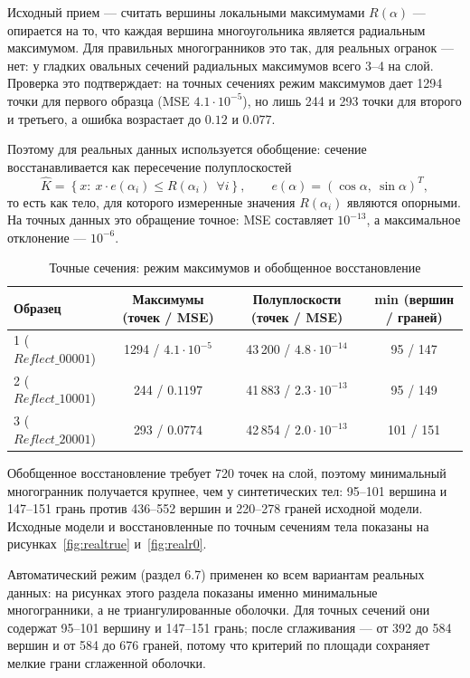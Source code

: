 \documentclass[12pt, a4paper]{article}
\begin{document}
Исходный прием --- считать вершины локальными максимумами $R(\alpha)$ --- опирается на то, что каждая вершина многоугольника является радиальным максимумом. Для правильных многогранников это так, для реальных огранок --- нет: у гладких овальных сечений радиальных максимумов всего 3--4 на слой. Проверка это подтверждает: на точных сечениях режим максимумов дает 1294 точки для первого образца (MSE $4.1\cdot10^{-5}$), но лишь 244 и 293 точки для второго и третьего, а ошибка возрастает до $0.12$ и $0.077$.

Поэтому для реальных данных используется обобщение: сечение восстанавливается как пересечение полуплоскостей
\[
\widehat K=\left\{x:\ x\cdot e(\alpha_i)\le R(\alpha_i)\ \ \forall i\right\},
\qquad e(\alpha)=(\cos\alpha,\ \sin\alpha)^T,
\]
то есть как тело, для которого измеренные значения $R(\alpha_i)$ являются опорными. На точных данных это обращение точное: MSE составляет $10^{-13}$, а максимальное отклонение --- $10^{-6}$.

\begin{table}[H]
\centering
\caption{Точные сечения: режим максимумов и обобщенное восстановление}
\label{tab:realmodes}
\footnotesize
\begin{tabular}{|l|c|c|c|}
\hline
Образец & Максимумы (точек / MSE) & Полуплоскости (точек / MSE) & min (вершин / граней) \\
\hline
1 ($Reflect\_00001$) & 1294 / $4.1\cdot10^{-5}$ & 43\,200 / $4.8\cdot10^{-14}$ & 95 / 147 \\
2 ($Reflect\_10001$) & 244 / $0.1197$ & 41\,883 / $2.3\cdot10^{-13}$ & 95 / 149 \\
3 ($Reflect\_20001$) & 293 / $0.0774$ & 42\,854 / $2.0\cdot10^{-13}$ & 101 / 151 \\
\hline
\end{tabular}
\end{table}

Обобщенное восстановление требует 720 точек на слой, поэтому минимальный многогранник получается крупнее, чем у синтетических тел: 95--101 вершина и 147--151 грань против 436--552 вершин и 220--278 граней исходной модели. Исходные модели и восстановленные по точным сечениям тела показаны на рисунках~\ref{fig:realtrue} и~\ref{fig:realr0}.

Автоматический режим (раздел 6.7) применен ко всем вариантам реальных данных: на рисунках этого раздела показаны именно минимальные многогранники, а не триангулированные оболочки. Для точных сечений они содержат 95--101 вершину и 147--151 грань; после сглаживания --- от 392 до 584 вершин и от 584 до 676 граней, потому что критерий по площади сохраняет мелкие грани сглаженной оболочки.
\end{document}
